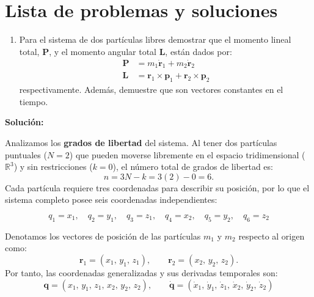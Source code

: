 \documentclass{article}
\newenvironment{AGbox}[1][7]%
{%
  \begin{tcolorbox}[
    enhanced, breakable,
    colframe=AppleGreen,
    colback=AppleGreen!#1,
    boxrule=1pt,
    borderline west={2mm}{-10mm}{AppleGreen},
    sharp corners=southwest,
    left=14pt,right=14pt,top=10pt,bottom=10pt,
     boxsep=6pt,
  ]%
}{%
  \end{tcolorbox}%
}
\begin{document}
\section*{\textcolor{Tarawera}{\textbf{Lista de problemas y soluciones}}}

\setlength{\columnsep}{2cm}

\begin{AGbox}[8]
\begin{enumerate}[label={{\textcolor{trueblue}{\textbf{Pr.} \arabic*.1}}}, start=3]
  \item Para el sistema de dos partículas libres demostrar que el momento lineal total, $\boldsymbol{P}$,
  y el momento angular total $\boldsymbol{L}$, están dados por:
  \begin{equation}
  \begin{split}
   \boldsymbol{P}  &= m_{1}\dot{\boldsymbol{r}}_{1} + m_{2}\dot{\boldsymbol{r}}_{2}\\
   \mathbf{L} &= \boldsymbol{r}_{1} \times \boldsymbol{p}_{1} + \boldsymbol{r}_{2} \times \boldsymbol{p}_{2}
  \end{split}
  \end{equation}
  respectivamente. Además, demuestre que son vectores constantes en el tiempo.
\end{enumerate}
\end{AGbox} \vspace{0.5cm}

\textcolor{Cinnabar}{\textbf{Solución:}}

Analizamos los \textbf{grados de libertad} del sistema.  
Al tener dos partículas puntuales ($N=2$) que pueden moverse libremente en el espacio tridimensional ($\mathbb{R}^{3}$) y sin restricciones ($k=0$), el número total de grados de libertad es:
\begin{equation}
n = 3N - k = 3(2) - 0 = 6.
\label{eq:grados-libertad}
\end{equation}
Cada partícula requiere tres coordenadas para describir su posición, por lo que el sistema completo posee seis coordenadas independientes:

\[ \boxed{q_{1} = x_{1}}, \quad \boxed{q_{2}=y_{1}}, \quad \boxed{q_{3}=z_{1}}, \quad \boxed{q_{4}=x_{2}}, \quad \boxed{q_{5}=y_{2}}, \quad \boxed{q_{6}=z_{2}} \]

\vspace{0.3cm}

Denotamos los vectores de posición de las partículas $m_1$ y $m_2$ respecto al origen como:
\begin{equation}
\boldsymbol{r}_1 = (x_1,\, y_1,\, z_1), \qquad
\boldsymbol{r}_2 = (x_2,\, y_2,\, z_2).
\label{eq:posiciones}
\end{equation}
Por tanto, las coordenadas generalizadas y sus derivadas temporales son:
\begin{equation}
\boldsymbol{q} = (x_1,\, y_1,\, z_1,\, x_2,\, y_2,\, z_2), 
\qquad
\dot{\boldsymbol{q}} = (\dot{x}_1,\, \dot{y}_1,\, \dot{z}_1,\, \dot{x}_2,\, \dot{y}_2,\, \dot{z}_2)
\label{eq:coordenadas}
\end{equation}
\end{document}
